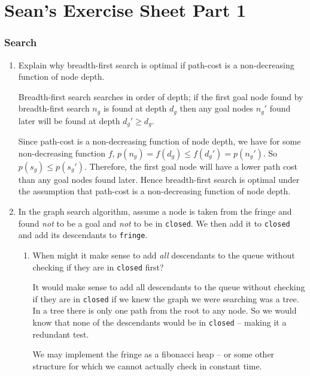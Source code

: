 \documentclass[10pt,\jkfside,a4paper]{article}
\begin{document}
\part{Sean's Exercise Sheet Part 1}

\setcounter{section}{2}

\section{Search}

\begin{enumerate}

\item Explain why breadth-first search is optimal if path-cost is a
non-decreasing function of node depth.

Breadth-first search searches in order of depth; if the first
goal node found by breadth-first search $n_g$ is found at depth $d_g$ then
any goal nodes $n_g'$ found later will be found at depth $d_g' \ge d_g$.

Since path-cost is a non-decreasing function of node depth, we have for some
non-decreasing function $f$, $p(n_g) = f(d_g) \le f(d_g') = p(n_g')$. So
$p(s_g) \le p(s_g')$. Therefore, the first goal node will have a lower path
cost than any goal nodes found later. Hence breadth-first search is optimal
under the assumption that path-cost is a non-decreasing function of node
depth.

\item In the graph search algorithm, assume a node is taken from the fringe
and found \textit{not} to be a goal and \textit{not} to be in
\texttt{closed}. We then add it to \texttt{closed} and add its descendants
to \texttt{fringe}.

\begin{enumerate}[label=(\alph*)]

\item When might it make sense to add \textit{all} descendants to the queue
without checking if they are in \texttt{closed} first?

It would make sense to add all descendants to the queue without checking if
they are in \texttt{closed} if we knew the graph we were searching was a
tree. In a tree there is only one path from the root to any node. So we
would know that none of the descendants would be in \texttt{closed} --
making it a redundant test.

{\color{blue}
We may implement the fringe as a fibonacci heap -- or some other structure
for which we cannot actually check in constant time.

}
\end{enumerate}
\end{enumerate}
\end{document}
